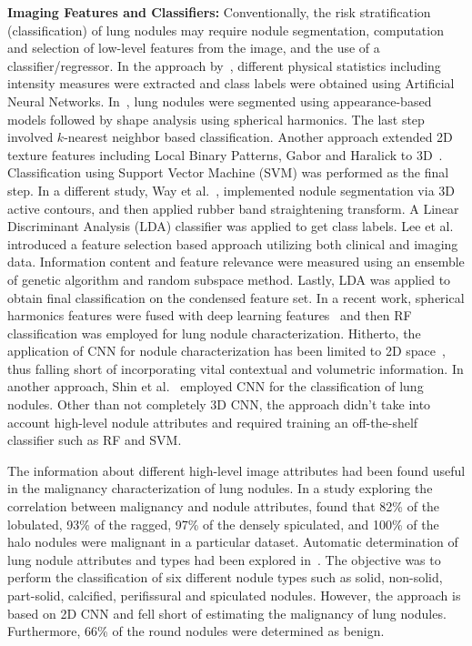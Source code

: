 \documentclass[journal]{IEEEtran}
\begin{document}
\noindent\textbf{Imaging Features and Classifiers:} Conventionally, the risk stratification (classification) of lung nodules may require nodule segmentation, computation and selection of low-level features from the image, and the use of a  classifier/regressor. In the approach by~\cite{uchiyama2003quantitative}, different physical statistics including intensity measures were extracted and class labels were obtained using Artificial Neural Networks. In~\cite{el20113d}, lung nodules were segmented using appearance-based models followed by shape analysis using spherical harmonics. The last step involved $k$-nearest neighbor based classification. Another approach extended 2D texture features including Local Binary Patterns, Gabor and Haralick to 3D~\cite{han2015texture}. Classification using Support Vector Machine (SVM) was performed as the final step. In a different study, Way et al.~\cite{way2006computer}, implemented nodule segmentation via 3D active contours, and then applied rubber band straightening transform. A Linear Discriminant Analysis (LDA) classifier was applied to get class labels. Lee et al.~\cite{lee2010computer} introduced a feature selection based approach utilizing both clinical and imaging data. Information content and feature relevance were measured using an ensemble of genetic algorithm and random subspace method. Lastly, LDA was applied to obtain final classification on the condensed feature set.
In a recent work, spherical harmonics features were fused with deep learning features~\cite{buty2016characterization} and then RF classification was employed for lung nodule characterization. Hitherto, the application of CNN for nodule characterization has been limited to 2D space~\cite{chen2016bridging}, thus falling short of incorporating vital contextual and volumetric information. In another approach, Shin et al.~\cite{shen2015multi} employed CNN for the classification of lung nodules. Other than not completely 3D CNN, the approach didn't take into account high-level nodule attributes and required training an off-the-shelf classifier such as RF and SVM.

The information about different high-level image attributes had been found useful in the malignancy characterization of lung nodules. In a study exploring the correlation between malignancy and nodule attributes, \cite{furuya1999new} found that 82\% of the lobulated, 93\% of the ragged, 97\% of the densely spiculated, and 100\% of the halo nodules were malignant in a particular dataset. Automatic determination of lung nodule attributes and types had been explored in~\cite{ciompi2017towards}. The objective was to perform the classification of six different nodule types such as solid, non-solid, part-solid, calcified, perifissural and spiculated nodules. However, the approach is based on 2D CNN and fell short of estimating the malignancy of lung nodules. Furthermore, 66\% of the round nodules were determined as benign.
\end{document}
